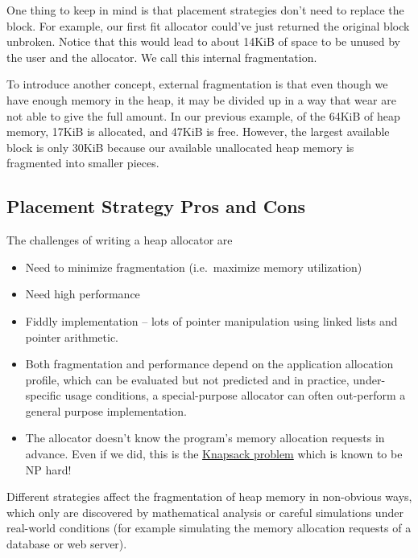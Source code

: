 One thing to keep in mind is that placement strategies don't need to replace the block.
For example, our first fit allocator could've just returned the original block unbroken.
Notice that this would lead to about 14KiB of space to be unused by the user and the allocator.
We call this internal fragmentation.

To introduce another concept, external fragmentation is that even though we have enough memory in the heap, it may be divided up in a way that wear are not able to give the full amount.
In our previous example, of the 64KiB of heap memory, 17KiB is allocated, and 47KiB is free.
However, the largest available block is only 30KiB because our available unallocated heap memory is fragmented into smaller pieces.

\subsection{Placement Strategy Pros and Cons}

The challenges of writing a heap allocator are
\begin{itemize}
\item Need to minimize fragmentation (i.e.~maximize memory utilization)
\item Need high performance
\item Fiddly implementation -- lots of pointer manipulation using linked lists and pointer arithmetic.
\item Both fragmentation and performance depend on the application allocation profile, which can be evaluated but not predicted and in practice, under-specific usage conditions, a special-purpose allocator can often out-perform a general purpose implementation.
\item The allocator doesn't know the program's memory allocation requests in advance. Even if we did, this is the \href{http://en.wikipedia.org/wiki/Knapsack_problem}{Knapsack problem} which is known to be NP hard!
\end{itemize}

Different strategies affect the fragmentation of heap memory in non-obvious ways, which only are discovered by mathematical analysis or careful simulations under real-world conditions (for example simulating the memory allocation requests of a database or web server).

